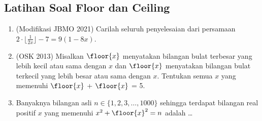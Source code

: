 \subsection{Latihan Soal Floor dan Ceiling}
\begin{enumerate}
    \item (Modifikasi JBMO 2021) Carilah seluruh penyelesaian dari persamaan $2\cdot \lfloor{\frac{1}{2x}}\rfloor - 7 = 9(1 - 8x)$.

    \item (OSK 2013) Misalkan $\floor{x}$ menyatakan bilangan bulat terbesar yang lebih kecil atau sama dengan $x$ dan $\floor{x}$ menyatakan bilangan bulat terkecil yang lebih besar atau sama dengan $x$. Tentukan semua $x$ yang memenuhi $\floor{x}$ + $\floor{x}$ = 5.
    
    \item Banyaknya bilangan asli $n \in \{1,2,3,\dots,1000\}$ sehingga terdapat bilangan real positif $x$ yang memenuhi $x^2+\floor{x}^2=n$ adalah \dots
\end{enumerate}